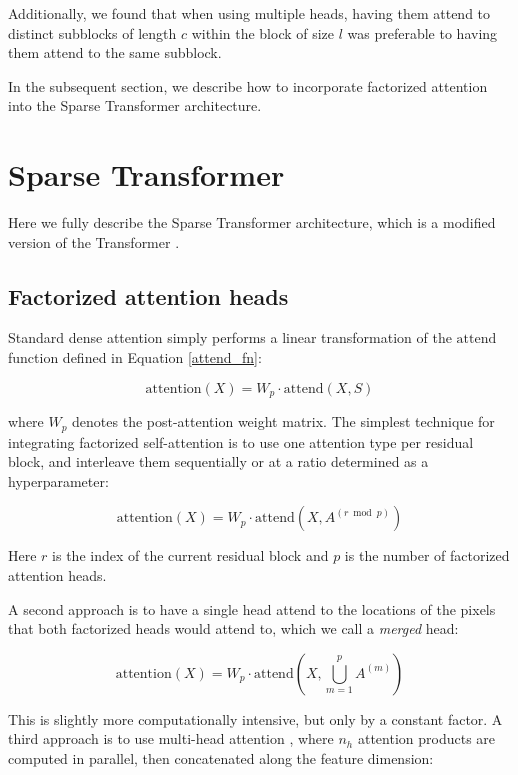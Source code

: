 Additionally, we found that when using multiple heads, having them attend to distinct subblocks of length $c$ within the block of size $l$ was preferable to having them attend to the same subblock.

In the subsequent section, we describe how to incorporate factorized attention into the Sparse Transformer architecture.

\section{Sparse Transformer} Here we fully describe the Sparse Transformer architecture, which is a modified version of the Transformer \cite{vaswani2017attention}.

\subsection{Factorized attention heads} Standard dense attention simply performs a linear transformation of the $\mathrm{attend}$ function defined in Equation \ref{attend_fn}:

\begin{equation}\label{wpmat}
\mathrm{attention}(X) = W_p \cdot \mathrm{attend}(X, S)\end{equation}

where $W_p$ denotes the post-attention weight matrix. The simplest technique for integrating factorized self-attention is to use one attention type per residual block, and interleave them sequentially or at a ratio determined as a hyperparameter:

\begin{equation}\label{sepwpmat}
\mathrm{attention}(X) = W_p \cdot \mathrm{attend}(X, A^{(r \bmod p)})\end{equation}

Here $r$ is the index of the current residual block and $p$ is the number of factorized attention heads.

A second approach is to have a single head attend to the locations of the pixels that both factorized heads would attend to, which we call a \textit{merged} head:

\begin{equation}\label{mergedmat}
\mathrm{attention}(X) = W_p \cdot \mathrm{attend}(X, \bigcup_{m=1}^{p} A^{(m)})\end{equation}

This is slightly more computationally intensive, but only by a constant factor. A third approach is to use multi-head attention \cite{vaswani2017attention}, where $n_{h}$ attention products are computed in parallel, then concatenated along the feature dimension:

